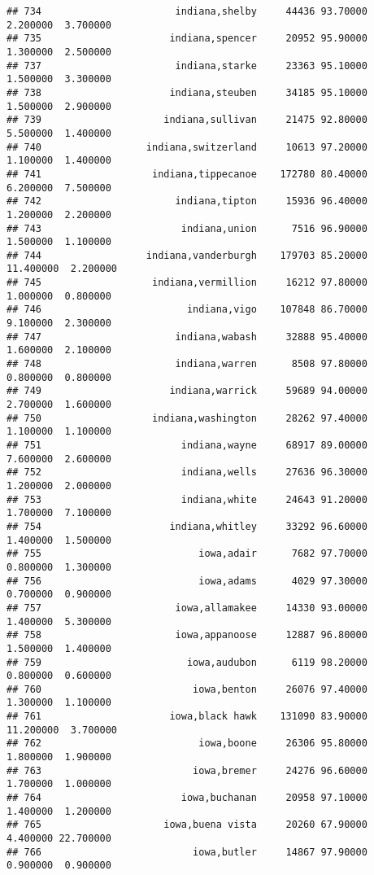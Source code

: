\documentclass[
]{article}
\begin{document}
\begin{verbatim}
## 734                       indiana,shelby     44436 93.70000  2.200000  3.700000
## 735                      indiana,spencer     20952 95.90000  1.300000  2.500000
## 737                       indiana,starke     23363 95.10000  1.500000  3.300000
## 738                      indiana,steuben     34185 95.10000  1.500000  2.900000
## 739                     indiana,sullivan     21475 92.80000  5.500000  1.400000
## 740                  indiana,switzerland     10613 97.20000  1.100000  1.400000
## 741                   indiana,tippecanoe    172780 80.40000  6.200000  7.500000
## 742                       indiana,tipton     15936 96.40000  1.200000  2.200000
## 743                        indiana,union      7516 96.90000  1.500000  1.100000
## 744                  indiana,vanderburgh    179703 85.20000 11.400000  2.200000
## 745                   indiana,vermillion     16212 97.80000  1.000000  0.800000
## 746                         indiana,vigo    107848 86.70000  9.100000  2.300000
## 747                       indiana,wabash     32888 95.40000  1.600000  2.100000
## 748                       indiana,warren      8508 97.80000  0.800000  0.800000
## 749                      indiana,warrick     59689 94.00000  2.700000  1.600000
## 750                   indiana,washington     28262 97.40000  1.100000  1.100000
## 751                        indiana,wayne     68917 89.00000  7.600000  2.600000
## 752                        indiana,wells     27636 96.30000  1.200000  2.000000
## 753                        indiana,white     24643 91.20000  1.700000  7.100000
## 754                      indiana,whitley     33292 96.60000  1.400000  1.500000
## 755                           iowa,adair      7682 97.70000  0.800000  1.300000
## 756                           iowa,adams      4029 97.30000  0.700000  0.900000
## 757                       iowa,allamakee     14330 93.00000  1.400000  5.300000
## 758                       iowa,appanoose     12887 96.80000  1.500000  1.400000
## 759                         iowa,audubon      6119 98.20000  0.800000  0.600000
## 760                          iowa,benton     26076 97.40000  1.300000  1.100000
## 761                      iowa,black hawk    131090 83.90000 11.200000  3.700000
## 762                           iowa,boone     26306 95.80000  1.800000  1.900000
## 763                          iowa,bremer     24276 96.60000  1.700000  1.000000
## 764                        iowa,buchanan     20958 97.10000  1.400000  1.200000
## 765                     iowa,buena vista     20260 67.90000  4.400000 22.700000
## 766                          iowa,butler     14867 97.90000  0.900000  0.900000

\end{verbatim}
\end{document}
